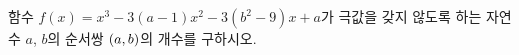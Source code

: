함수 $f(x)=x^3-3(a-1)x^2-3(b^2-9)x+a$가 극값을 갖지 않도록 하는 자연수 $a$, $b$의 순서쌍 $(a{,}\mkern3mu\mathopen{}b)$의 개수를 구하시오.
